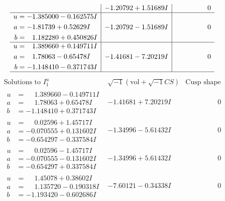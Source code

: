 \documentclass[1p]{elsarticle_modified}
\theoremstyle{definition}
\newcommand{\I}{\sqrt{-1}}
\begin{document}
$$\begin{array}{c|c|c}
 & -1.20792 + 1.51689 I & \phantom{-0.000000 } 0 \\ \hline\begin{aligned}
u &= -1.385000 - 0.162575 I \\
a &= -1.81739 + 0.52629 I \\
b &= \phantom{-}1.182280 + 0.450826 I\end{aligned}
 & -1.20792 - 1.51689 I & \phantom{-0.000000 } 0 \\ \hline\begin{aligned}
u &= \phantom{-}1.389660 + 0.149711 I \\
a &= \phantom{-}1.78063 - 0.65478 I \\
b &= -1.148410 - 0.371743 I\end{aligned}
 & -1.41681 - 7.20219 I & \phantom{-0.000000 } 0\\
 \hline 
 \end{array}$$\newpage$$\begin{array}{c|c|c}  
\text{Solutions to }I^u_{1}& \I (\text{vol} + \sqrt{-1}CS) & \text{Cusp shape}\\
 \hline 
\begin{aligned}
u &= \phantom{-}1.389660 - 0.149711 I \\
a &= \phantom{-}1.78063 + 0.65478 I \\
b &= -1.148410 + 0.371743 I\end{aligned}
 & -1.41681 + 7.20219 I & \phantom{-0.000000 } 0 \\ \hline\begin{aligned}
u &= \phantom{-}0.02596 + 1.45717 I \\
a &= -0.070555 + 0.131602 I \\
b &= -0.654297 - 0.337584 I\end{aligned}
 & -1.34996 - 5.61432 I & \phantom{-0.000000 } 0 \\ \hline\begin{aligned}
u &= \phantom{-}0.02596 - 1.45717 I \\
a &= -0.070555 - 0.131602 I \\
b &= -0.654297 + 0.337584 I\end{aligned}
 & -1.34996 + 5.61432 I & \phantom{-0.000000 } 0 \\ \hline\begin{aligned}
u &= \phantom{-}1.45078 + 0.38602 I \\
a &= \phantom{-}1.135720 - 0.190318 I \\
b &= -1.193420 - 0.602686 I\end{aligned}
 & -7.60121 - 0.34338 I & \phantom{-0.000000 } 0 \\ \hline\begin{aligned}

\end{aligned}
\end{array}$$
\end{document}
